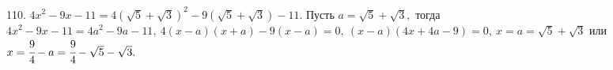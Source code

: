 110. $4x^2-9x-11=4(\sqrt{5}+\sqrt{3})^2-9(\sqrt{5}+\sqrt{3})-11.$ Пусть $a=\sqrt{5}+\sqrt{3},$ тогда $4x^2-9x-11=4a^2-9a-11,\ 4(x-a)(x+a)-9(x-a)=0,\ (x-a)(4x+4a-9)=0,\ x=a=\sqrt{5}+\sqrt{3}$ или $x=\cfrac{9}{4}-a=\cfrac{9}{4}-\sqrt{5}-\sqrt{3}.$\\
